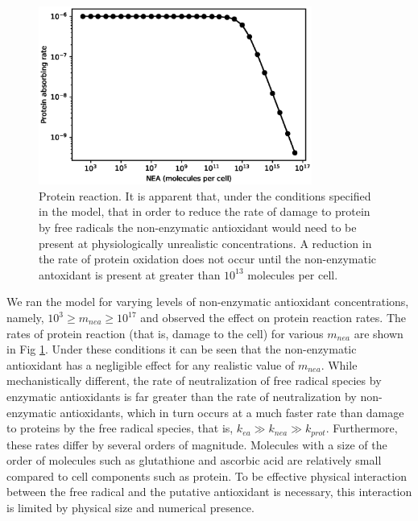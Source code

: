 \documentclass[preprint,12pt,authoryear]{elsarticle}
\begin{document}
\begin{figure}
\begin{center}
\includegraphics[width=0.8\textwidth]{Protein_absorbing.eps}
\end{center}
\caption{\label{fig:prot} Protein reaction.
It is apparent that, under the conditions specified in the model, that in order to reduce the rate of damage to protein by free radicals the non-enzymatic antioxidant would need to be present at physiologically unrealistic concentrations. A reduction in the rate of protein oxidation does not occur until the non-enzymatic antoxidant is present at greater than 
$10^{13}$ molecules per cell.
}
\end{figure}


We ran the model for varying levels of non-enzymatic antioxidant concentrations, 
namely, $10^3 \geq m_{nea} \geq 10^{17}$ and observed the effect on protein
reaction rates.
The rates of protein reaction (that is, damage to the cell) for various $m_{nea}$ 
are shown in Fig \ref{fig:prot}. 
Under these conditions it can be seen that the non-enzymatic antioxidant has 
a negligible effect for any realistic value of $m_{nea}$. 
While mechanistically different, the rate of neutralization of free radical species 
by enzymatic antioxidants is far greater than the rate of neutralization by 
non-enzymatic antioxidants, which in turn occurs at a much faster rate than damage 
to proteins by the free radical species, that is, $k_{ea} \gg k_{nea} \gg k_{prot}$.
Furthermore, these rates differ by several orders of magnitude. 
Molecules with a size of the order of molecules such as glutathione and ascorbic acid 
are relatively small compared to cell components such as protein. To be effective 
physical interaction between the free radical and the putative antioxidant is necessary, 
this interaction is limited by physical size and numerical presence.
\end{document}
